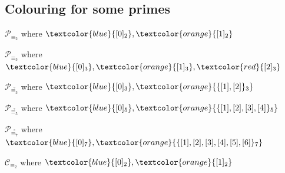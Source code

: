 \documentclass[10pt,serif, professionalfont]{beamer}
\begin{document}
\subsection{Colouring for some primes}


\begin{frame}{$\mathcal{P}_{\equiv_{2}}$ where 
    $\textcolor{blue}{[0]_{2}},\textcolor{orange}{[1]_{2}}$}

    
\end{frame}

\begin{frame}{$\mathcal{P}_{\equiv_{3}}$ where 
    $\textcolor{blue}{[0]_{3}},\textcolor{orange}{[1]_{3}},\textcolor{red}{[2]_{3}}$}

    
\end{frame}
\begin{frame}{$\mathcal{P}_{\stackrel{\circ}{\equiv_{3}}}$ where 
    $\textcolor{blue}{[0]_{3}},\textcolor{orange}{\lbrace [1],[2] \rbrace_{3}}$}

    
\end{frame}
\begin{frame}{$\mathcal{P}_{\stackrel{\circ}{\equiv_{5}}}$ where 
    $\textcolor{blue}{[0]_{5}},\textcolor{orange}{\lbrace [1],[2],[3],[4] \rbrace_{5}}$}

    
\end{frame}
\begin{frame}{$\mathcal{P}_{\stackrel{\circ}{\equiv_{7}}}$ where 
    $\textcolor{blue}{[0]_{7}},\textcolor{orange}{\lbrace [1],[2],[3],[4],[5],[6] \rbrace_{7}}$}

    
\end{frame}



\begin{frame}{$\mathcal{C}_{\equiv_{2}}$ where 
    $\textcolor{blue}{[0]_{2}},\textcolor{orange}{[1]_{2}}$}

    
\end{frame}
\end{document}
